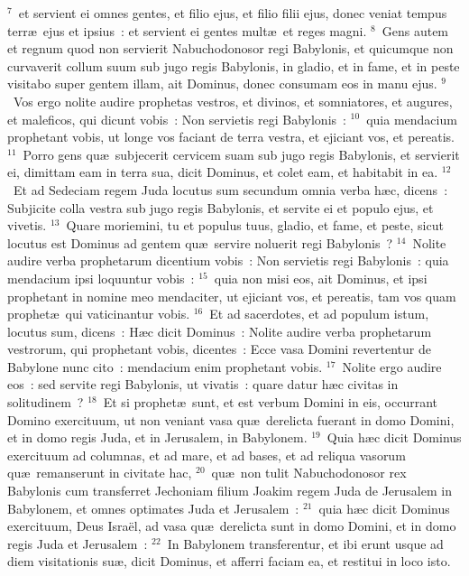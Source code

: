 ${}^{7}$~et servient ei omnes gentes, et filio ejus, et filio filii ejus, donec veniat tempus terr\ae\ ejus et ipsius~: et servient ei gentes mult\ae\ et reges magni.
${}^{8}$~Gens autem et regnum quod non servierit Nabuchodonosor regi Babylonis, et quicumque non curvaverit collum suum sub jugo regis Babylonis, in gladio, et in fame, et in peste visitabo super gentem illam, ait Dominus, donec consumam eos in manu ejus.
${}^{9}$~Vos ergo nolite audire prophetas vestros, et divinos, et somniatores, et augures, et maleficos, qui dicunt vobis~: Non servietis regi Babylonis~:
${}^{10}$~quia mendacium prophetant vobis, ut longe vos faciant de terra vestra, et ejiciant vos, et pereatis.
${}^{11}$~Porro gens qu\ae\ subjecerit cervicem suam sub jugo regis Babylonis, et servierit ei, dimittam eam in terra sua, dicit Dominus, et colet eam, et habitabit in ea.
${}^{12}$~Et ad Sedeciam regem Juda locutus sum secundum omnia verba h\ae c, dicens~: Subjicite colla vestra sub jugo regis Babylonis, et servite ei et populo ejus, et vivetis.
${}^{13}$~Quare moriemini, tu et populus tuus, gladio, et fame, et peste, sicut locutus est Dominus ad gentem qu\ae\ servire noluerit regi Babylonis~?
${}^{14}$~Nolite audire verba prophetarum dicentium vobis~: Non servietis regi Babylonis~: quia mendacium ipsi loquuntur vobis~:
${}^{15}$~quia non misi eos, ait Dominus, et ipsi prophetant in nomine meo mendaciter, ut ejiciant vos, et pereatis, tam vos quam prophet\ae\ qui vaticinantur vobis.
${}^{16}$~Et ad sacerdotes, et ad populum istum, locutus sum, dicens~: H\ae c dicit Dominus~: Nolite audire verba prophetarum vestrorum, qui prophetant vobis, dicentes~: Ecce vasa Domini revertentur de Babylone nunc cito~: mendacium enim prophetant vobis.
${}^{17}$~Nolite ergo audire eos~: sed servite regi Babylonis, ut vivatis~: quare datur h\ae c civitas in solitudinem~?
${}^{18}$~Et si prophet\ae\ sunt, et est verbum Domini in eis, occurrant Domino exercituum, ut non veniant vasa qu\ae\ derelicta fuerant in domo Domini, et in domo regis Juda, et in Jerusalem, in Babylonem.
${}^{19}$~Quia h\ae c dicit Dominus exercituum ad columnas, et ad mare, et ad bases, et ad reliqua vasorum qu\ae\ remanserunt in civitate hac,
${}^{20}$~qu\ae\ non tulit Nabuchodonosor rex Babylonis cum transferret Jechoniam filium Joakim regem Juda de Jerusalem in Babylonem, et omnes optimates Juda et Jerusalem~:
${}^{21}$~quia h\ae c dicit Dominus exercituum, Deus Isra\"el, ad vasa qu\ae\ derelicta sunt in domo Domini, et in domo regis Juda et Jerusalem~:
${}^{22}$~In Babylonem transferentur, et ibi erunt usque ad diem visitationis su\ae , dicit Dominus, et afferri faciam ea, et restitui in loco isto.
